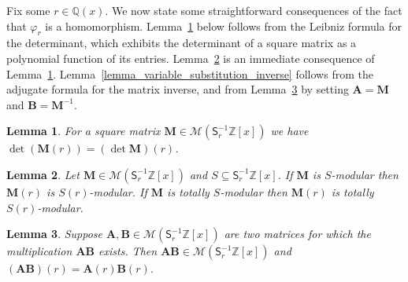 \documentclass[a4paper, 11pt]{article}
\newcommand{\Z}{\mathbb{Z}}
\newcommand{\bA}{\bm{A}}
\newcommand{\bB}{\bm{B}}
\newcommand{\bM}{\bm{M}}
\newcommand{\indet}{x}
\newcommand{\polyring}{\Z[\indet]}
\newcommand{\polyS}{S}
\newcommand{\polyM}{\bM}
\newtheorem{lemma}{Lemma}
\begin{document}
	
	Fix some $r\in\mathbb{Q}(\indet)$. We now state some straightforward consequences of the fact that $\varphi_r$ is a homomorphism. Lemma~\ref{lemma_determinant_homomorphism} below follows from the Leibniz formula for the determinant, which exhibits the determinant of a square matrix as a polynomial function of its entries. Lemma~\ref{lemma_totally_S_r_modular} is an immediate consequence of Lemma~\ref{lemma_determinant_homomorphism}. Lemma~\ref{lemma_variable_substitution_inverse} follows from the adjugate formula for the matrix inverse, and from Lemma~\ref{lemma_variable_substitution_multiplication} by setting $\bA=\bM$ and $\bB=\bM^{-1}$.
\begin{lemma} For a square matrix $\bM\in\mathcal{M}(\mathsf{S}_r^{-1}\polyring)$ we have $\det (\polyM(r)) = (\det \polyM)(r)$.
\label{lemma_determinant_homomorphism}

\end{lemma}

\begin{lemma}
\label{lemma_totally_S_r_modular} Let $\bM\in\mathcal{M}(\mathsf{S}_r^{-1}\polyring)$ and $\polyS\subseteq\mathsf{S}_r^{-1}\polyring$. If $\bM$ is $\polyS$-modular then $\bM(r)$ is $\polyS(r)$-modular. If $\bM$ is totally $\polyS$-modular then $\bM(r)$ is totally $\polyS(r)$-modular. 
\end{lemma}
		
\begin{lemma}
\label{lemma_variable_substitution_multiplication}Suppose $\bA,\bB\in\mathcal{M}(\mathsf{S}_r^{-1}\polyring)$ are two matrices for which the multiplication $\bA\bB$ exists. Then $\bA\bB\in\mathcal{M}(\mathsf{S}_r^{-1}\polyring)$ and $(\bA\bB)(r)=\bA(r)\bB(r)$.
\end{lemma}
\end{document}
